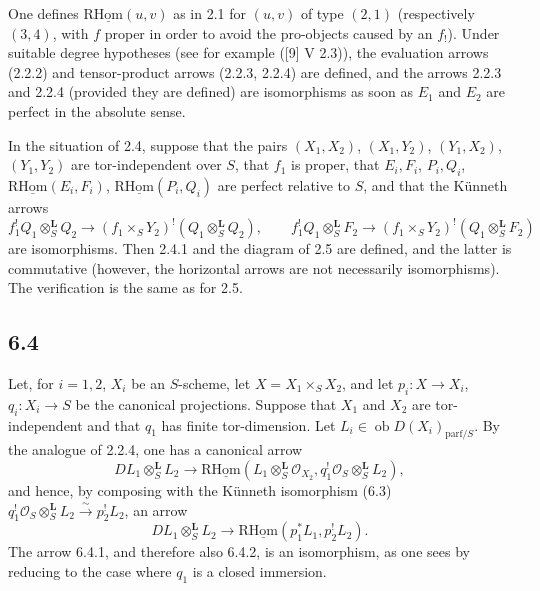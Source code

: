 \documentclass[11pt]{article}
\providecommand{\cO}{\mathcal{O}}
\begin{document}
One defines $\mathrm{R}\underline{\mathrm{Hom}}(u,v)$ as in 2.1 for $(u,v)$ of type $(2,1)$ (respectively $(3,4)$, with $f$ proper in order to avoid the pro-objects caused by an $f_!$). Under suitable degree hypotheses (see for example ([9] V 2.3)), the evaluation arrows (2.2.2) and tensor-product arrows (2.2.3, 2.2.4) are defined, and the arrows 2.2.3 and 2.2.4 (provided they are defined) are isomorphisms as soon as $E_1$ and $E_2$ are perfect in the absolute sense.

In the situation of 2.4, suppose that the pairs $(X_1,X_2)$, $(X_1,Y_2)$, $(Y_1,X_2)$, $(Y_1,Y_2)$ are tor-independent over $S$, that $f_1$ is proper, that $E_i,F_i$, $P_i,Q_i$, $\mathrm{R}\underline{\mathrm{Hom}}(E_i,F_i)$, $\mathrm{R}\underline{\mathrm{Hom}}(P_i,Q_i)$ are perfect relative to $S$, and that the Künneth arrows
\[
f_1^!Q_1\otimes_S^{\mathbf L}Q_2\to(f_1\times_SY_2)^!(Q_1\otimes_S^{\mathbf L}Q_2),\qquad
f_1^!Q_1\otimes_S^{\mathbf L}F_2\to(f_1\times_SY_2)^!(Q_1\otimes_S^{\mathbf L}F_2)
\]
are isomorphisms. Then 2.4.1 and the diagram of 2.5 are defined, and the latter is commutative (however, the horizontal arrows are not necessarily isomorphisms). The verification is the same as for 2.5.

\subsection*{6.4}
Let, for $i=1,2$, $X_i$ be an $S$-scheme, let $X=X_1\times_SX_2$, and let $p_i:X\to X_i$, $q_i:X_i\to S$ be the canonical projections. Suppose that $X_1$ and $X_2$ are tor-independent and that $q_1$ has finite tor-dimension. Let $L_i\in\operatorname{ob}D(X_i)_{\mathrm{parf}/S}$. By the analogue of 2.2.4, one has a canonical arrow
\begin{equation}
\tag{6.4.1}
DL_1\otimes_S^{\mathbf L}L_2\longrightarrow \mathrm{R}\underline{\mathrm{Hom}}(L_1\otimes_S^{\mathbf L}\cO_{X_2},q_1^!\cO_S\otimes_S^{\mathbf L}L_2),
\end{equation}
and hence, by composing with the Künneth isomorphism (6.3) $q_1^!\cO_S\otimes_S^{\mathbf L}L_2\xrightarrow{\sim}p_2^!L_2$, an arrow
\begin{equation}
\tag{6.4.2}
DL_1\otimes_S^{\mathbf L}L_2\longrightarrow\mathrm{R}\underline{\mathrm{Hom}}(p_1^*L_1,p_2^!L_2).
\end{equation}
The arrow 6.4.1, and therefore also 6.4.2, is an isomorphism, as one sees by reducing to the case where $q_1$ is a closed immersion.
\end{document}
